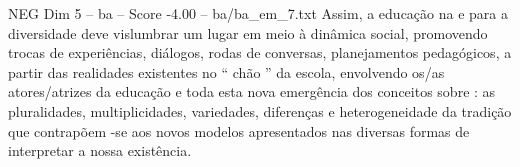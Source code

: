 \begin{textsample}{NEG Dim 5 – ba – Score -4.00 – ba/ba\_em\_7.txt}
Assim, a educação na e para a diversidade deve vislumbrar um lugar em meio à dinâmica social, promovendo trocas de experiências, diálogos, rodas de conversas, planejamentos pedagógicos, a partir das realidades existentes no “ chão ” da escola, envolvendo os/as atores/atrizes da educação e toda esta nova emergência dos conceitos sobre : as pluralidades, multiplicidades, variedades, diferenças e heterogeneidade da tradição que contrapõem -se aos novos modelos apresentados nas diversas formas de interpretar a nossa existência.

\end{textsample}
